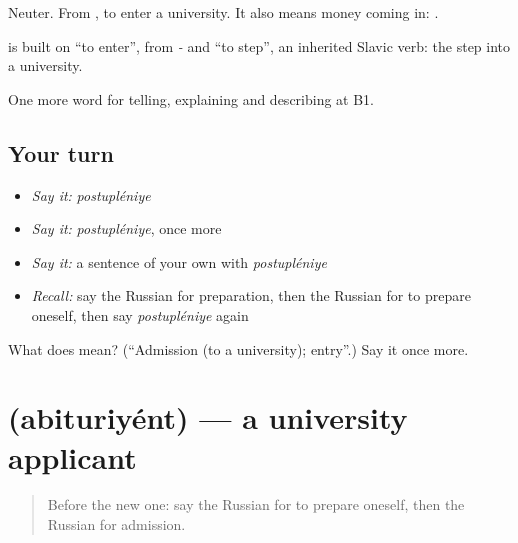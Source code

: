 Neuter. From \emph{}, to enter a university. It also means money coming in: \emph{ }.

\begin{cousinweb}
\textbf{} is built on \emph{} \textquotedblleft{}to enter\textquotedblright{}, from \emph{-} and \emph{} \textquotedblleft{}to step\textquotedblright{}, an inherited Slavic verb: the step into a university.
\end{cousinweb}

\begin{grammarlens}[title={What you've built}]
One more word for telling, explaining and describing at B1.
\end{grammarlens}

\subsection*{Your turn}
\begin{itemize}
\raggedright
  \item \emph{Say it:} \emph{postupléniye}
  \item \emph{Say it:} \emph{postupléniye}, once more
  \item \emph{Say it:} a sentence of your own with \emph{postupléniye}
  \item \emph{Recall:} say the Russian for preparation, then the Russian for to prepare oneself, then say \emph{postupléniye} again
\end{itemize}

\begin{tcolorbox}[breakable,colback=teal!4,colframe=teal!35!black,title={Before you move on}]
What does  mean? (\textquotedblleft{}Admission (to a university); entry\textquotedblright{}.) Say it once more.
\end{tcolorbox}
\section[\texorpdfstring{\ru{абитуриент} (abituriyént)}{абитуриент (abituriyént)}]{ (abituriyént) — a university applicant}

\label{lesson:RU-C383-abiturient}



\begin{quote}
Before the new one: say the Russian for to prepare oneself, then the Russian for admission.
\end{quote}

